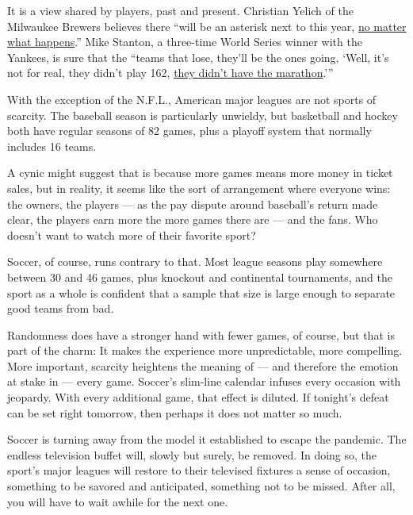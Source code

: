 It is a view shared by players, past and present. Christian Yelich of
the Milwaukee Brewers believes there ``will be an asterisk next to this
year,
\href{https://www.usatoday.com/story/sports/mlb/columnist/bob-nightengale/2020/07/22/2020-mlb-season-60-games-crazy-unconventional/5486001002/}{no
matter what happens}.'' Mike Stanton, a three-time World Series winner
with the Yankees, is sure that the ``teams that lose, they'll be the
ones going, `Well, it's not for real, they didn't play 162,
\href{https://www.nytimes.com/2020/06/23/sports/baseball/mlb-60-game-season.html\#:~:text=\%E2\%80\%9CThe\%20teams\%20that\%20lose\%2C\%20they,the\%20Yankees\%2C\%20said\%20on\%20Tuesday.}{they
didn't have the marathon}.'''

With the exception of the N.F.L., American major leagues are not sports
of scarcity. The baseball season is particularly unwieldy, but
basketball and hockey both have regular seasons of 82 games, plus a
playoff system that normally includes 16 teams.

A cynic might suggest that is because more games means more money in
ticket sales, but in reality, it seems like the sort of arrangement
where everyone wins: the owners, the players --- as the pay dispute
around baseball's return made clear, the players earn more the more
games there are --- and the fans. Who doesn't want to watch more of
their favorite sport?

Soccer, of course, runs contrary to that. Most league seasons play
somewhere between 30 and 46 games, plus knockout and continental
tournaments, and the sport as a whole is confident that a sample that
size is large enough to separate good teams from bad.

Randomness does have a stronger hand with fewer games, of course, but
that is part of the charm: It makes the experience more unpredictable,
more compelling. More important, scarcity heightens the meaning of ---
and therefore the emotion at stake in --- every game. Soccer's slim-line
calendar infuses every occasion with jeopardy. With every additional
game, that effect is diluted. If tonight's defeat can be set right
tomorrow, then perhaps it does not matter so much.

Soccer is turning away from the model it established to escape the
pandemic. The endless television buffet will, slowly but surely, be
removed. In doing so, the sport's major leagues will restore to their
televised fixtures a sense of occasion, something to be savored and
anticipated, something not to be missed. After all, you will have to
wait awhile for the next one.

